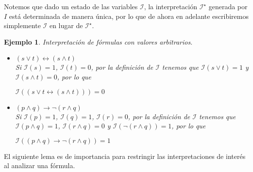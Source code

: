 \documentclass[letterpaper,12pt]{article}
\newtheorem{ejem}{Ejemplo}[]
\begin{document}
    Notemos que dado un estado de las variables $\mathcal{I}$, la 
    interpretación $\mathcal{I^{\star}}$ generada por $I$ está 
    determinada de manera única, por lo que de ahora en adelante
    escribiremos simplemente $\mathcal{I}$ en lugar de $\mathcal{I^{\star}}$.
    \begin{ejem} 
        Interpretación de fórmulas con valores arbitrarios.
        \begin{itemize}
            \item[i)] $(s \lor t) \leftrightarrow (s \land t)$ \\
            Si $\mathcal{I}(s) = 1$, $\mathcal{I}(t) = 0$, por la definición 
            de $\mathcal{I}$ tenemos que 
            $\mathcal{I}(s \lor t) = 1$ y $\mathcal{I}(s \land t) = 0$,
            por lo que 
            \begin{center}
                $\mathcal{I}((s \lor t \leftrightarrow (s \land t))) = 0$
            \end{center}
        
            \item[ii)] $(p \land q) \rightarrow \neg (r \land q)$ \\
            Si $\mathcal{I}(p) = 1$, $\mathcal{I}(q) = 1$, $\mathcal{I}(r) = 0$,
            por la definición de $\mathcal{I}$ tenemos que  
            $\mathcal{I}(p \land q) = 1$, $\mathcal{I}(r \land q) = 0$ y
            $\mathcal{I}(\neg (r \land q)) = 1$, por lo que
            \begin{center}
                $\mathcal{I}((p \land q) \rightarrow \neg (r \land q)) = 1$
            \end{center}
        \end{itemize}
    \end{ejem}

    El siguiente lema es de importancia para restringir las interpretaciones
    de interés al analizar una fórmula.
\end{document}
